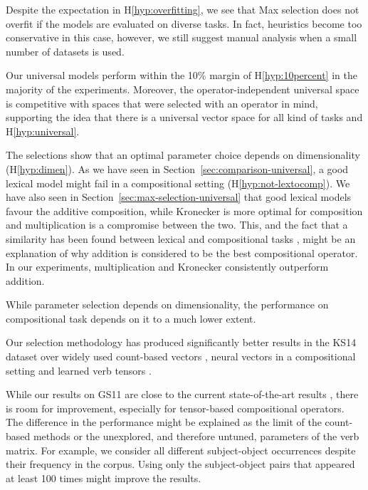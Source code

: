 Despite the expectation in H\ref{hyp:overfitting}, we see that Max selection does not overfit if the models are evaluated on diverse tasks. In fact, heuristics become too conservative in this case, however, we still suggest manual analysis when a small number of datasets is used.

Our universal models perform within the 10\% margin of H\ref{hyp:10percent} in the majority of the experiments. Moreover, the operator-independent universal space is competitive with spaces that were selected with an operator in mind, supporting the idea that there is a universal vector space for all kind of tasks and H\ref{hyp:universal}.

The selections show that an optimal parameter choice depends on dimensionality (H\ref{hyp:dimen}). As we have seen in Section~\ref{sec:comparison-universal}, a good lexical model might fail in a compositional setting (H\ref{hyp:not-lextocomp}). We have also seen in Section~\ref{sec:max-selection-universal} that good lexical models favour the additive composition, while Kronecker is more optimal for composition and multiplication is a compromise between the two. This, and the fact that a similarity has been found between lexical and compositional tasks \cite[\textcolor{citecolor}{Section~4}]{kiela-clark:2014:CVSC}, might be an explanation of why addition is considered to be the best compositional operator. In our experiments, multiplication and Kronecker consistently outperform addition.

While parameter selection depends on dimensionality, the performance on compositional task depends on it to a much lower extent.

Our selection methodology has produced significantly better results in the KS14 dataset over widely used count-based vectors \cite{milajevs-EtAl:2014:EMNLP2014}, neural vectors in a compositional setting \cite{milajevs-EtAl:2014:EMNLP2014,kim2015neural} and learned verb tensors \cite{fried-polajnar-clark:2015:ACL-IJCNLP,hashimoto-tsuruoka:2016:P16-1,hashimoto-tsuruoka:2015:CVSC}.

While our results on GS11 are close to the current state-of-the-art results \cite{hashimoto-tsuruoka:2016:P16-1}, there is room for improvement, especially for tensor-based compositional operators. The difference in the performance might be explained as the limit of the count-based methods or the unexplored, and therefore untuned, parameters of the verb matrix. For example, we consider all different subject-object occurrences despite their frequency in the corpus. Using only the subject-object pairs that appeared at least 100 times might improve the results.

